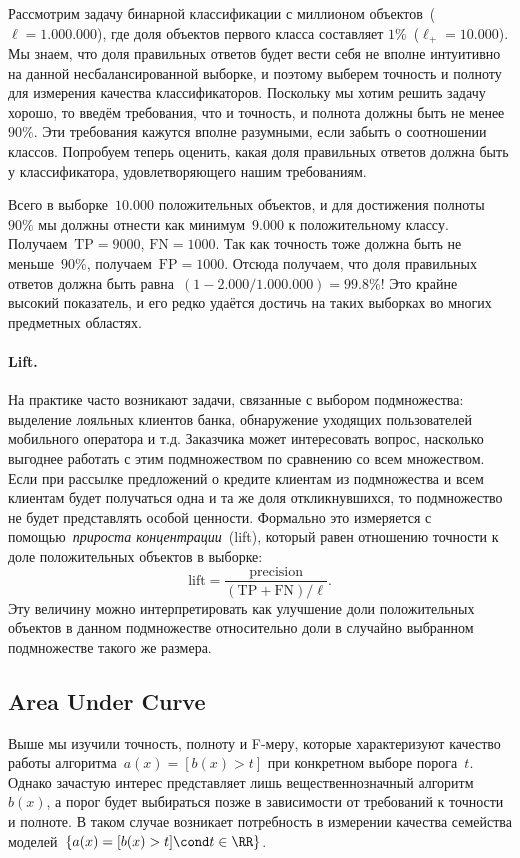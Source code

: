 \documentclass[12pt,fleqn]{article}
\begin{document}
Рассмотрим задачу бинарной классификации с миллионом объектов~($\ell = 1.000.000$),
где доля объектов первого класса составляет $1\%$~($\ell_+ = 10.000$).
Мы знаем, что доля правильных ответов будет вести себя не вполне интуитивно
на данной несбалансированной выборке, и поэтому выберем точность и полноту для измерения
качества классификаторов.
Поскольку мы хотим решить задачу хорошо, то введём требования, что и точность, и полнота
должны быть не менее~$90\%$.
Эти требования кажутся вполне разумными, если забыть о соотношении классов.
Попробуем теперь оценить, какая доля правильных ответов должна быть у классификатора,
удовлетворяющего нашим требованиям.

Всего в выборке~$10.000$ положительных объектов, и для достижения полноты~$90\%$
мы должны отнести как минимум~$9.000$ к положительному классу.
Получаем~$\text{TP} = 9000$, $\text{FN} = 1000$.
Так как точность тоже должна быть не меньше~$90\%$, получаем~$\text{FP} = 1000$.
Отсюда получаем, что доля правильных ответов должна быть равна~$(1 - 2.000/1.000.000) = 99.8\%$!
Это крайне высокий показатель, и его редко удаётся достичь на таких выборках во многих предметных областях.

\paragraph{Lift.}
На практике часто возникают задачи, связанные с выбором подмножества: выделение лояльных клиентов банка,
обнаружение уходящих пользователей мобильного оператора и т.д.
Заказчика может интересовать вопрос, насколько выгоднее работать с этим подмножеством
по сравнению со всем множеством.
Если при рассылке предложений о кредите клиентам из подмножества и всем клиентам
будет получаться одна и та же доля откликнувшихся, то подмножество не будет
представлять особой ценности.
Формально это измеряется с помощью~\emph{прироста концентрации}~(lift),
который равен отношению точности к доле положительных объектов в выборке:
\[
    \text{lift}
    =
    \frac{
        \text{precision}
    }{
        (\text{TP} + \text{FN}) / \ell
    }.
\]
Эту величину можно интерпретировать как улучшение доли положительных объектов
в данном подмножестве относительно доли в случайно выбранном подмножестве такого же размера.

\subsection{Area Under Curve}
Выше мы изучили точность, полноту и F-меру, которые характеризуют
качество работы алгоритма~$a(x) = [b(x) > t]$ при конкретном выборе порога~$t$.
Однако зачастую интерес представляет лишь вещественнозначный алгоритм~$b(x)$,
а порог будет выбираться позже в зависимости от требований к точности и полноте.
В таком случае возникает потребность
в измерении качества семейства моделей~$\{a(x) = [b(x) > t] \cond t \in \RR\}$.
\end{document}
